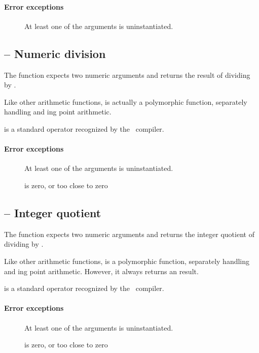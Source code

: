\paragraph{Error exceptions}
\begin{description}
\item[]
At least one of the arguments is uninstantiated.
\end{description}

\subsection{\function{/} -- Numeric division}
The \function{/} function expects two numeric arguments and returns the result of dividing  by .
    
Like other arithmetic functions, \q{/} is actually a polymorphic function, separately handling  and ing point arithmetic.

\function{/} is a standard operator recognized by the \go\ compiler.
    
\paragraph{Error exceptions}
\begin{description}
\item[]
At least one of the arguments is uninstantiated.
\item[]
 is zero, or too close to zero
\end{description}

\subsection{ -- Integer quotient}
The  function expects two numeric arguments and returns the integer quotient of dividing  by .
    
Like other arithmetic functions,  is a polymorphic function, separately handling  and ing point arithmetic. However, it always returns an  result.

 is a standard operator recognized by the \go\ compiler.
    
\paragraph{Error exceptions}
\begin{description}
\item[]
At least one of the arguments is uninstantiated.
\item[]
 is zero, or too close to zero
\end{description}

